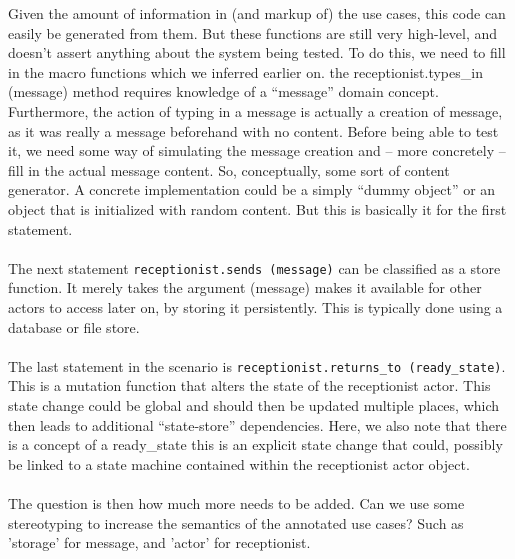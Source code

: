 \documentclass[10pt,a4paper]{article}
\begin{document}
Given the amount of information in (and markup of) the use cases, this code can easily be generated from them. But these functions are still very high-level, and doesn't assert anything about the system being tested. To do this, we need to fill in the macro functions which we inferred earlier on.
the receptionist.types\_in (message) method requires knowledge of a ``message'' domain concept. Furthermore, the action of typing in a message is actually a creation of message, as it was really a message beforehand with no content. Before being able to test it, we need some way of simulating the message creation and -- more concretely -- fill in the actual message content. So, conceptually, some sort of content generator. A concrete implementation could be a simply ``dummy object'' or an object that is initialized with random content. But this is basically it for the first statement.\\\\
The next statement \texttt{receptionist.sends (message)} can be classified as a store function. It merely takes the argument (message) makes it available for other actors to access later on, by storing it persistently. This is typically done using a database or file store.\\\\
The last statement in the scenario is \texttt{receptionist.returns\_to (ready\_state)}. This is a mutation function that alters the state of the receptionist actor. This state change could be global and should then  be updated multiple places, which then leads to additional ``state-store'' dependencies. Here, we also note that there is a concept of a ready\_state this is an explicit state change that could, possibly be linked to a state machine contained within the receptionist actor object.\\\\




The question is then how much more needs to be added. Can we use some stereotyping to increase the semantics of the annotated use cases? Such as 'storage' for message, and 'actor' for receptionist.
\end{document}

